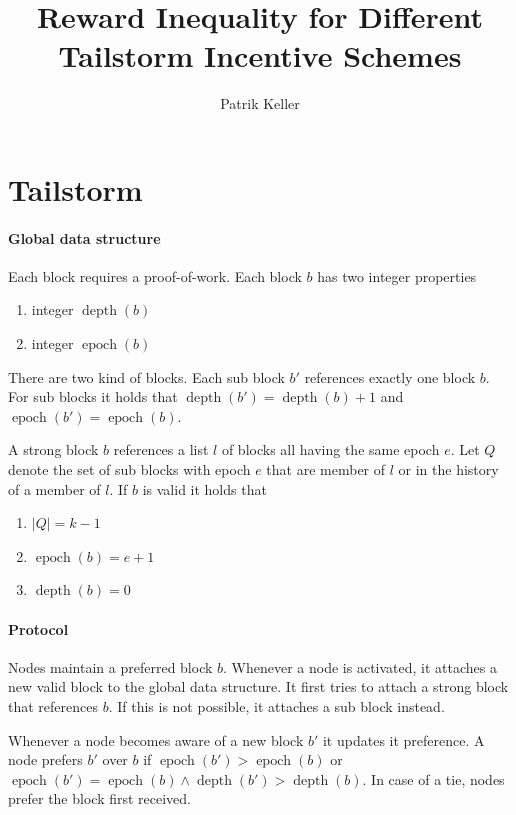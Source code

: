\documentclass{article}
\title{Reward Inequality for Different Tailstorm Incentive Schemes}
\author{Patrik Keller}
\begin{document}
\maketitle

\section{Tailstorm}

\paragraph{Global data structure}

Each block requires a proof-of-work. Each block $b$ has two integer properties 
\begin{enumerate}
\item integer $\operatorname{depth}(b)$
\item integer $\operatorname{epoch}(b)$
\end{enumerate}

There are two kind of blocks. Each sub block $b'$ references exactly one block $b$. For sub blocks it holds that
$\operatorname{depth}(b') = \operatorname{depth}(b) + 1$ and $\operatorname{epoch}(b') = \operatorname{epoch}(b)$.

A strong block $b$ references a list $l$ of blocks all having the same epoch $e$. Let $Q$ denote the set of sub blocks with epoch $e$ that are member of $l$ or in the history of a member of $l$. If $b$ is valid it holds that
\begin{enumerate}
  \item $|Q| = k - 1$
  \item $\operatorname{epoch}(b) = e + 1$
  \item $\operatorname{depth}(b) = 0$
\end{enumerate}

\paragraph{Protocol}

Nodes maintain a preferred block $b$. Whenever a node is activated, it attaches a new valid block to the global data structure. It first tries to attach a strong block that references $b$. If this is not possible, it attaches a sub block instead.

Whenever a node becomes aware of a new block $b'$ it updates it preference. A node prefers $b'$ over $b$ if $\operatorname{epoch}(b') > \operatorname{epoch}(b)$ or $\operatorname{epoch}(b') = \operatorname{epoch}(b) \wedge \operatorname{depth}(b') > \operatorname{depth}(b)$. In case of a tie, nodes prefer the block first received.
\end{document}
